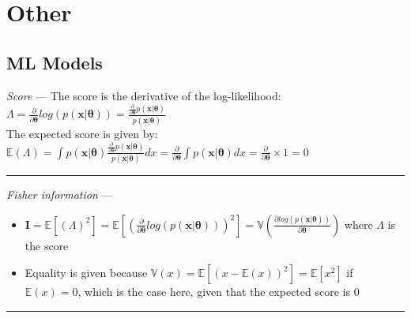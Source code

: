 \section{Other}
\subsection*{ML Models}
\emph{Score} --- 
The score is the derivative of the log-likelihood: $\Lambda = \frac{\partial}{\partial \boldsymbol{\theta}} log(p( \boldsymbol{x} | \boldsymbol{\theta})) = \frac{ \frac{\partial}{\partial \boldsymbol{\theta}} p( \boldsymbol{x} | \boldsymbol{\theta})}{ p( \boldsymbol{x} | \boldsymbol{\theta}) }$\\
The expected score is given by: $\mathbb{E}(\Lambda) = \int p( \boldsymbol{x} | \boldsymbol{\theta}) \frac{ \frac{\partial}{\partial \boldsymbol{\theta}} p( \boldsymbol{x} | \boldsymbol{\theta})}{ p( \boldsymbol{x} | \boldsymbol{\theta}) } dx = \frac{\partial}{\partial \boldsymbol{\theta}} \int p( \boldsymbol{x} | \boldsymbol{\theta}) dx = \frac{\partial}{\partial \boldsymbol{\theta}} \times 1 = 0$

{\color{lightgray}\hrule height 0.001mm}

\emph{Fisher information} --- 
\begin{itemize}
    \item $\boldsymbol{I} = \mathbb{E} [(\Lambda)^2] = \mathbb{E} [ ( \frac{\partial}{ \partial \boldsymbol{\theta} } log( p ( \boldsymbol{x} | \boldsymbol{\theta} ) ) )^2 ] = \mathbb{V} ( \frac{ \partial log( p(\boldsymbol{x} | \boldsymbol{\theta}) ) }{ \partial \boldsymbol{\theta}} )$ where $\Lambda$ is the score
    \item Equality is given because $\mathbb{V}(x) = \mathbb{E}[(x-\mathbb{E}(x))^2] = \mathbb{E}[x^2]$ if $\mathbb{E}(x) = 0$, which is the case here, given that the expected score is $0$
\end{itemize}

{\color{lightgray}\hrule height 0.001mm}

